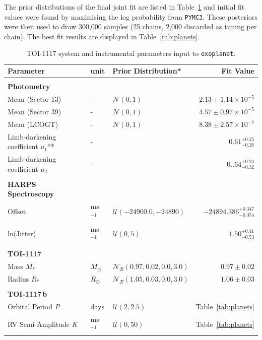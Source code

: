 \documentclass[fleqn,usenatbib,useAMS]{mnras}
\begin{document}
The prior distributions of the final joint fit are listed in Table~\ref{tab:priors} and initial fit values were found by maximising the log probability from \texttt{PYMC3}. These posteriors were then used to draw 300,000 samples (25 chains, 2,000 discarded as tuning per chain). The best fit results are displayed in Table~\ref{tab:planets}.

\begin{table}
 \caption{TOI-1117 system and instrumental parameters input to \texttt{exoplanet}.}
 \label{tab:priors}
  \begin{tabular}{lllr}
   \hline
   Parameter & unit & Prior Distribution* & Fit Value \\
   \hline
   \\{\textbf{Photometry}}\\
   Mean (Sector 13) & - & $\mathcal{N}\left(0,1\right)$ & $2.13\pm1.14\times10^{-5}$\\
   Mean (Sector 39) & - & $\mathcal{N}\left(0,1\right)$ & $4.57\pm0.97\times10^{-5}$\\
   Mean (LCOGT) & - & $\mathcal{N}\left(0,1\right)$ & $8.38\pm2.57\times10^{-5}$\\
   Limb-darkening coefficient $u_1$**& - & \cite{Kipping} & $0.61^{+0.25}_{-0.26}$\\
   Limb-darkening coefficient $u_2$& - & \cite{Kipping} & $0..64^{+0.24}_{-0.32}$\\
   \\{\textbf{HARPS Spectroscopy}}\\
   Offset & ms$^{-1}$ & $\mathcal{U}\left(-24900.0,-24890\right)$ & $-24894.386^{+0.347}_{-0.354}$\\
   ln(Jitter) & ms$^{-1}$ & $\mathcal{U}\left(0,5\right)$ & $1.50^{+0.41}_{-0.53}$\\
   \\{\textbf{TOI-1117}}\\
   Mass $M_{\ast}$ & $M_{\odot}$ & $\mathcal{N}_{\mathcal{B}}\left(0.97,0.02,0.0,3.0\right)$ & $0.97\pm0.02$\\
   Radius $R_{\ast}$ & $R_{\odot}$ & $\mathcal{N}_{\mathcal{B}}\left(1.05,0.03,0.0,3.0\right)$ & $1.06\pm0.03$\\
  \\ {\textbf{TOI-1117\,b}}\\
   Orbital Period \textit{P} & days & $\mathcal{U}\left(2,2.5\right)$ & Table~\ref{tab:planets}\\
   RV Semi-Amplitude \textit{K} & ms$^{-1}$  & $\mathcal{U}\left(0,50\right)$ & Table~\ref{tab:planets}\\

\end{tabular}
\end{table}
\end{document}
